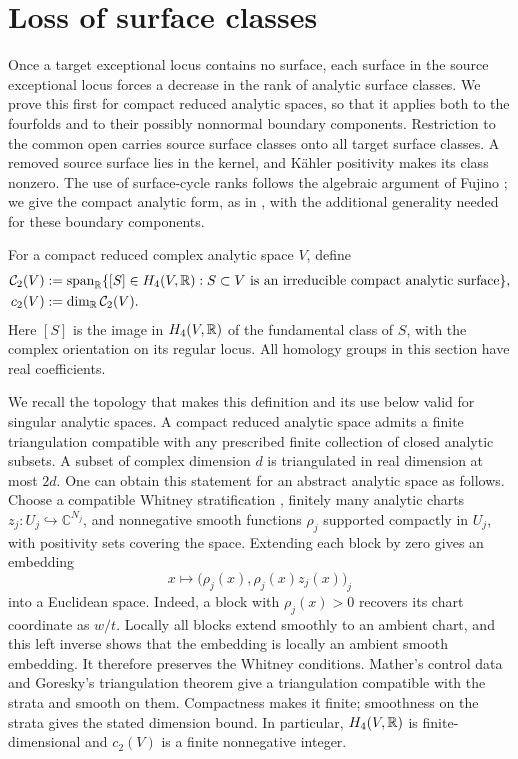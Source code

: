 \section{Loss of surface classes}\label{sec:cycles}

Once a target exceptional locus contains no surface, each surface in the
source exceptional locus forces a decrease in the rank of analytic
surface classes.  We prove this first for compact reduced analytic
spaces, so that it applies both to the fourfolds and to their possibly
nonnormal boundary components.  Restriction to the common open carries
source surface classes onto all target surface classes.  A removed
source surface lies in the kernel, and K\"ahler positivity makes its
class nonzero.
The use of surface-cycle ranks follows the algebraic argument of
Fujino \cite[Lemma~2.3]{Fujino2004}; we give the compact analytic form,
as in \cite[Section~4.1]{OrdinaryKahler}, with the additional generality
needed for these boundary components.

For a compact reduced complex analytic space $V$, define
\begin{equation}\label{eq:cycle-rank}
 \begin{split}
 \mathcal C_2(V)
 &:=\operatorname{span}_{\mathbb R}\{[S]\in H_4(V,\mathbb R):
       S\subset V\text{ is an irreducible compact analytic surface}\},\\
 c_2(V)&:=\dim_{\mathbb R}\mathcal C_2(V).
 \end{split}
\end{equation}
Here $[S]$ is the image in $H_4(V,\mathbb R)$ of the fundamental class of $S$,
with the complex orientation on its regular locus.  All homology groups
in this section have real coefficients.

We recall the topology that makes this definition and its use below
valid for singular analytic spaces.  A compact reduced analytic space
admits a finite triangulation compatible with any prescribed finite
collection of closed analytic subsets.  A subset of complex dimension
$d$ is triangulated in real dimension at most $2d$.  One can obtain this
statement for an abstract analytic space as follows.  Choose a compatible
Whitney stratification
\cite[Chapter~III, Propositions~1.5 and~2.2.2]{Teissier1982}, finitely
many analytic charts $z_j:U_j\hookrightarrow\mathbb C^{N_j}$, and nonnegative
smooth functions $\rho_j$ supported compactly in $U_j$, with positivity
sets covering the space.  Extending each block by zero gives an embedding
\[
 x\longmapsto\bigl(\rho_j(x),\rho_j(x)z_j(x)\bigr)_j
\]
into a Euclidean space.  Indeed, a block with $\rho_j(x)>0$ recovers its
chart coordinate as $w/t$.  Locally all blocks extend smoothly to an
ambient chart, and this left inverse shows that the embedding is locally
an ambient smooth embedding.  It therefore preserves the Whitney
conditions.  Mather's control data
\cite[Section~7, Proposition~7.1, and Section~8]{Mather1970} and
Goresky's triangulation theorem \cite[Section~5]{Goresky1978} give a
triangulation compatible with the strata and smooth on them.  Compactness
makes it finite; smoothness on the strata gives the stated dimension
bound.  In particular, $H_4(V,\mathbb R)$ is finite-dimensional and $c_2(V)$
is a finite nonnegative integer.

